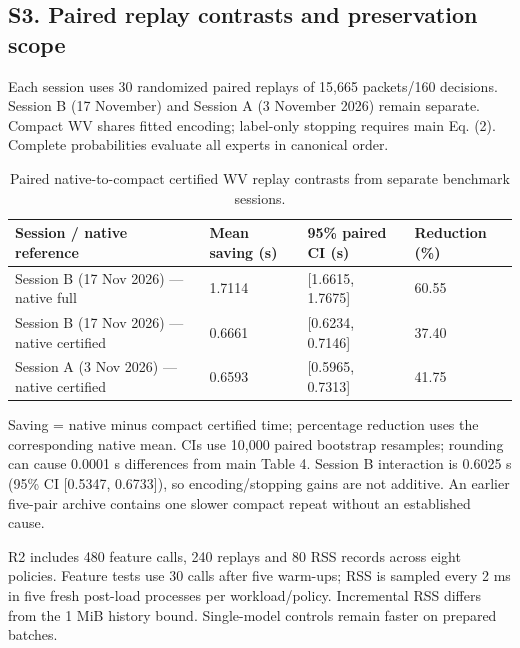\documentclass[10pt,a4paper]{article}
\begin{document}
\subsection*{S3. Paired replay contrasts and preservation scope}

Each session uses 30 randomized paired replays of 15,665 packets/160 decisions. Session B (17 November) and Session A (3 November 2026) remain separate. Compact WV shares fitted encoding; label-only stopping requires main Eq. (2). Complete probabilities evaluate all experts in canonical order.

\begin{table}[H]\centering\small\setlength{\tabcolsep}{3pt}\renewcommand{\arraystretch}{1.1}

\caption{Paired native-to-compact certified WV replay contrasts from separate benchmark sessions.}\label{sup:serving}

\begin{tabular}{L{0.35\dimexpr{}\tabcolsep\relax}L{0.21\dimexpr{}\tabcolsep\relax}L{0.22\dimexpr{}\tabcolsep\relax}L{0.22\dimexpr{}\tabcolsep\relax}}\toprule

Session / native reference & Mean saving (s) & 95\% paired CI (s) & Reduction (\%)\\\midrule

Session B (17 Nov 2026) --- native full & 1.7114 & [1.6615, 1.7675] & 60.55\\

Session B (17 Nov 2026) --- native certified & 0.6661 & [0.6234, 0.7146] & 37.40\\

Session A (3 Nov 2026) --- native certified & 0.6593 & [0.5965, 0.7313] & 41.75\\

\bottomrule\end{tabular}\end{table}

Saving = native minus compact certified time; percentage reduction uses the corresponding native mean. CIs use 10,000 paired bootstrap resamples; rounding can cause 0.0001 s differences from main Table 4. Session B interaction is 0.6025 s (95\% CI [0.5347, 0.6733]), so encoding/stopping gains are not additive. An earlier five-pair archive contains one slower compact repeat without an established cause.

R2 includes 480 feature calls, 240 replays and 80 RSS records across eight policies. Feature tests use 30 calls after five warm-ups; RSS is sampled every 2 ms in five fresh post-load processes per workload/policy. Incremental RSS differs from the 1 MiB history bound. Single-model controls remain faster on prepared batches.
\end{document}
